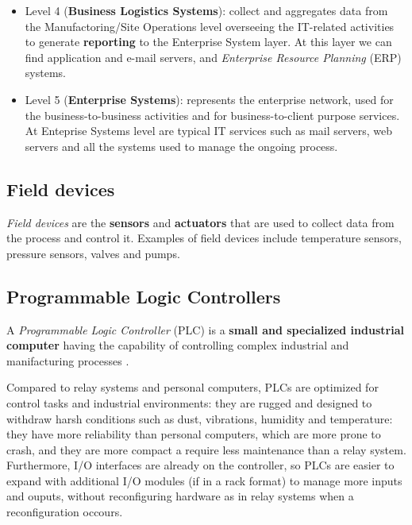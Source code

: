 \begin{itemize}
	\item Level 4 (\textbf{Business Logistics Systems}): collect and aggregates data from the Manufactoring/Site Operations level overseeing the IT-related activities to generate \textbf{reporting} to the Enterprise System layer. At this layer we can find application and e-mail servers, and \textit{Enterprise Resource Planning} (ERP) systems.
	
	\item Level 5 (\textbf{Enterprise Systems}): represents the enterprise network, used for the business-to-business activities and for business-to-client purpose services. At Enteprise Systems level are typical IT services such as mail servers, web servers and all the systems used to manage the ongoing process.
\end{itemize}

\subsection{Field devices}
\label{subsec:field_devs}
\textit{Field devices} are the \textbf{sensors} and \textbf{actuators} that are used to collect data from the process and control it. Examples of field devices include temperature sensors, pressure sensors, valves and pumps.
%

\subsection{Programmable Logic Controllers}
\label{subsec:plc}
A \textit{Programmable Logic Controller} (PLC) is a \textbf{small and specialized industrial computer} having the capability of controlling complex industrial and manifacturing processes \cite{plc_definition}.

\bigskip
Compared to relay systems and personal computers, PLCs are optimized for control tasks and industrial environments: they are rugged and designed to withdraw harsh conditions such as dust, vibrations, humidity and temperature: they have more reliability than personal computers, which are more prone to crash, and they are more compact a require less maintenance than a relay system.
Furthermore, I/O interfaces are already on the controller, so PLCs are easier to expand with additional I/O modules (if in a rack format) to manage more inputs and ouputs, without reconfiguring hardware as in relay systems when a reconfiguration occours. 

